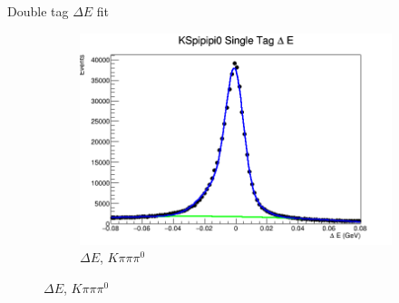 \documentclass{beamer}
\begin{document}
\begin{frame}{Double tag $\Delta E$ fit}
\begin{figure}
\begin{subfigure}{0.4\textwidth}
      \includegraphics[width=\textwidth]{KSpipipi0DeltaE.png}
      \caption{$\Delta E$, $K\pi\pi\pi^0$}
    \end{subfigure}
  \end{figure}
\end{frame}
\end{document}

